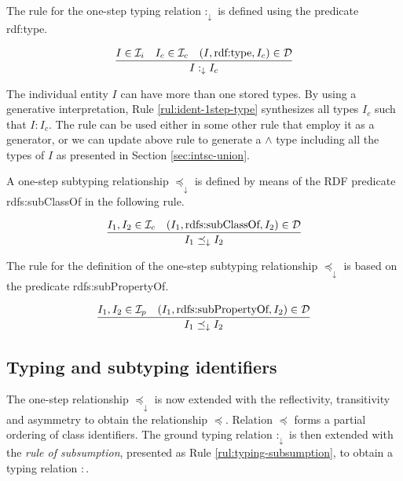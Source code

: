 \documentclass[runningheads]{llncs}
\newcommand{\darr}{\downarrow}
\newcommand{\Ii}{{\cal I}_i}
\newcommand{\Ic}{{\cal I}_c}
\newcommand{\Ip}{{\cal I}_p}
\newcommand{\memo}[1]{}
\newcommand{\notes}[1]{\noindent\begin{small}-- \emph{#1}\\\end{small}}
\begin{document}

\memo{Oportunity to introduce ``mixed'' objects including ground and schema components.}

The rule for the one-step typing relation $:_\darr$ is defined using
the predicate rdf:type.

\begin{equation}
\label{rul:ident-1step-type}
\dfrac{I\in\Ii\quad I_c\in\Ic\quad (I,\text{rdf:type},I_c)\in \D}
      {I :_\darr I_c}
\end{equation}

The individual entity $I$ can have more than one stored types. By
using a generative interpretation, Rule \ref{rul:ident-1step-type}
synthesizes all types $I_c$ such that $I:I_c$. The rule can be used
either in some other rule that employ it as a generator, or we can
update above rule to generate a $\land$ type including all the types
of $I$ as presented in Section \ref{sec:intsc-union}.

A one-step subtyping relationship $\preceq_\darr$ is defined by means
of the RDF predicate rdfs:sub\-ClassOf in the following rule.

\begin{equation}
\dfrac{I_1,I_2\in\Ic \quad (I_1,\text{rdfs:subClassOf},I_2)\in \D}
{I_1 \preceq_\darr\/I_2}
\end{equation}

The rule for the definition of the one-step subtyping relationship
$\preceq_\darr$ is based on the predicate rdfs:subPropertyOf.

\begin{equation}
\dfrac{I_1,I_2\in\Ip \quad (I_1,\text{rdfs:subPropertyOf},I_2)\in \D}
      {I_1\preceq_\darr\/I_2}
\end{equation}





\subsection{Typing and subtyping identifiers\label{sec:idents-typing}}

The one-step relationship $\preceq_\darr$ is now extended with the
reflectivity, transitivity and asymmetry to obtain the relationship
$\preceq$. Relation $\preceq$ forms a partial ordering of class
identifiers. The ground typing relation $:_\darr$ is then extended
with the \emph{rule of subsumption}, presented as Rule
\ref{rul:typing-subsumption}, to obtain a typing relation $:$.
\end{document}
